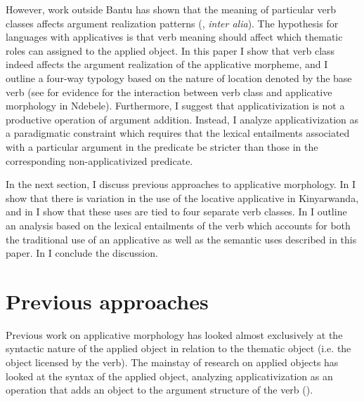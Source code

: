 \documentclass[output=paper]{langsci/langscibook}
\begin{document}
 However, work outside Bantu has shown that the meaning of particular verb classes affects argument realization patterns (\citealt{fillmore:1970,levin:1993,lrh:2008a,beavers:2011a}, \emph{inter alia}). The hypothesis for languages with applicatives is that verb meaning should affect which thematic roles can assigned to the applied object. In this paper I show that verb class indeed affects the argument realization of the applicative morpheme, and I outline a four-way typology based on the nature of location denoted by the base verb (see \citet{sibanda:2016} for evidence for the interaction between verb class and applicative morphology in Ndebele). Furthermore, I suggest that applicativization is not a productive operation of argument addition. Instead, I analyze applicativization as a paradigmatic constraint which requires that the lexical entailments associated with a particular argument in the predicate be stricter than those in the corresponding non-applicativized predicate.
 
 
In the next section, I discuss previous approaches to applicative morphology. In  I show that there is variation in the use of the locative applicative in Kinyarwanda, and in  I show that these uses are tied to four separate verb classes. In  I outline an analysis based on the lexical entailments of the verb which accounts for both the traditional use of an applicative as well as the semantic uses described in this paper. In  I conclude the discussion.
	 
 

\section{Previous approaches}\label{sec:jerro:2} %
 

 Previous work on applicative morphology has looked almost exclusively at the syntactic nature of the applied object in relation to the thematic object (i.e. the object licensed by the verb). The mainstay of research on applied objects has looked at the syntax of the applied object, analyzing applicativization as an operation that adds an object to the argument structure of the verb (\citealt{baker:1988,bresnan:1990,alsina:1992,AlsinaMchombo1993,marantz:1993,pylkkanen:2008, mcginnis:2001,mcginnis:2003,baker:2006,zeller:2006,zellerngoboka:2006,peterson:2007, jeong:2007,bakeretal:2012,jerro:2015}).  
  
\end{document}
